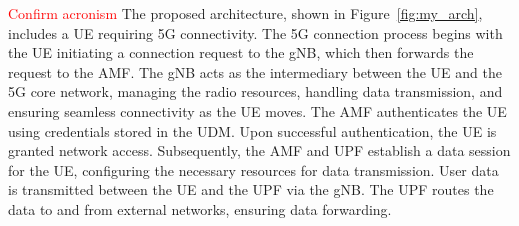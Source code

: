 
\textcolor{red}{Confirm acronism}
The proposed architecture, shown in Figure~\ref{fig:my_arch}, includes a UE requiring 5G connectivity.
The 5G connection process begins with the UE initiating a connection request to the gNB, which then forwards the request to the AMF\@.
The gNB acts as the intermediary between the UE and the 5G core network, managing the radio resources, handling data transmission, and ensuring seamless connectivity as the UE moves.
The AMF authenticates the UE using credentials stored in the UDM. Upon successful authentication, the UE is granted  network access.
Subsequently, the AMF and UPF establish a data session for the UE, configuring the necessary resources for data transmission.
User data is transmitted between the UE and the UPF via the gNB\@.
The UPF routes the data to and from external networks, ensuring data forwarding.



